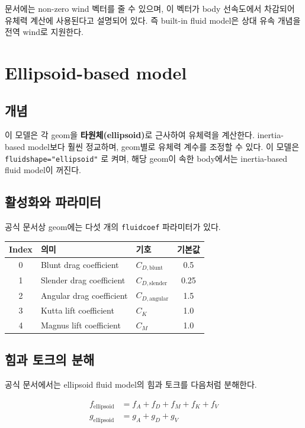\documentclass[11pt,a4paper]{article}
\begin{document}
문서에는 non-zero wind 벡터를 줄 수 있으며, 이 벡터가 body 선속도에서 차감되어 유체력 계산에 사용된다고 설명되어 있다. 즉 built-in fluid model은 상대 유속 개념을 전역 wind로 지원한다.

\section{Ellipsoid-based model}

\subsection{개념}

이 모델은 각 geom을 \textbf{타원체(ellipsoid)}로 근사하여 유체력을 계산한다. inertia-based model보다 훨씬 정교하며, geom별로 유체력 계수를 조정할 수 있다. 이 모델은 \texttt{fluidshape="ellipsoid"} 로 켜며, 해당 geom이 속한 body에서는 inertia-based fluid model이 꺼진다.

\subsection{활성화와 파라미터}

공식 문서상 geom에는 다섯 개의 \texttt{fluidcoef} 파라미터가 있다.

\begin{center}
\begin{tabular}{cllc}
\toprule
Index & 의미 & 기호 & 기본값 \\
\midrule
0 & Blunt drag coefficient & $C_{D,\text{blunt}}$ & 0.5 \\
1 & Slender drag coefficient & $C_{D,\text{slender}}$ & 0.25 \\
2 & Angular drag coefficient & $C_{D,\text{angular}}$ & 1.5 \\
3 & Kutta lift coefficient & $C_K$ & 1.0 \\
4 & Magnus lift coefficient & $C_M$ & 1.0 \\
\bottomrule
\end{tabular}
\end{center}

\subsection{힘과 토크의 분해}

공식 문서에서는 ellipsoid fluid model의 힘과 토크를 다음처럼 분해한다.

\begin{align}
f_{\text{ellipsoid}} &= f_A + f_D + f_M + f_K + f_V \\
g_{\text{ellipsoid}} &= g_A + g_D + g_V
\end{align}
\end{document}
